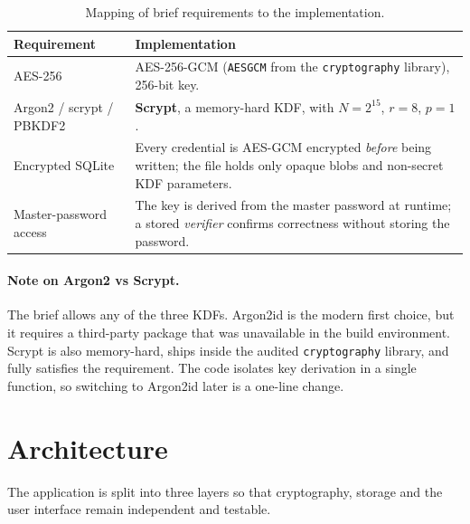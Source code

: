 \documentclass[11pt,a4paper]{article}
\begin{document}
\begin{table}[H]
\centering
\renewcommand{\arraystretch}{1.35}
\begin{tabularx}{\textwidth}{@{}p{4.2cm}X@{}}
\toprule
\textbf{Requirement} & \textbf{Implementation} \\
\midrule
AES-256 & AES-256-GCM (\texttt{AESGCM} from the \texttt{cryptography} library), 256-bit key. \\
Argon2 / scrypt / PBKDF2 & \textbf{Scrypt}, a memory-hard KDF, with $N=2^{15}$, $r=8$, $p=1$. \\
Encrypted SQLite & Every credential is AES-GCM encrypted \emph{before} being written; the file holds only opaque blobs and non-secret KDF parameters. \\
Master-password access & The key is derived from the master password at runtime; a stored \emph{verifier} confirms correctness without storing the password. \\
\bottomrule
\end{tabularx}
\caption{Mapping of brief requirements to the implementation.}
\label{tab:req}
\end{table}

\paragraph{Note on Argon2 vs Scrypt.} The brief allows any of the three KDFs.
Argon2id is the modern first choice, but it requires a third-party package that
was unavailable in the build environment. Scrypt is also memory-hard, ships
inside the audited \texttt{cryptography} library, and fully satisfies the
requirement. The code isolates key derivation in a single function, so switching
to Argon2id later is a one-line change.

\section{Architecture}
The application is split into three layers so that cryptography, storage and the
user interface remain independent and testable.
\end{document}
